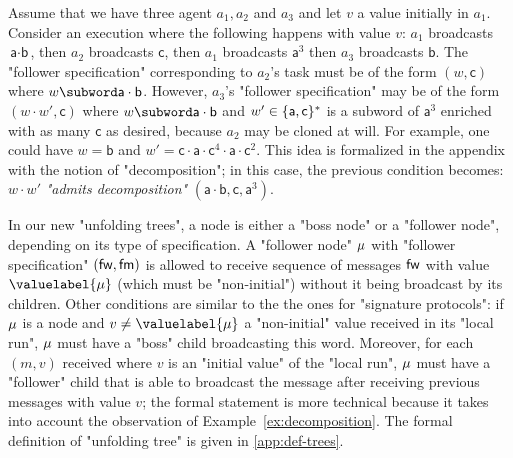 \begin{example}
\label{ex:decomposition}
Assume that we have three agent $a_1,a_2$ and $a_3$ and let $v$ a value initially in $a_1$. Consider an execution where the following happens with value $v$: $a_1$ broadcasts $\textsf{a} \cdot \textsf{b}$, then $a_2$ broadcasts $\textsf{c}$, then $a_1$ broadcasts $\textsf{a}^3$ then $a_3$ broadcasts $\textsf{b}$. The "follower specification" corresponding to $a_2$'s task must be of the form $(w, \textsf{c})$ where $w \subword \textsf{a} \cdot \textsf{b}$. However, $a_3$'s "follower specification" may be of the form $(w \cdot w', \textsf{c})$ where $w \subword \textsf{a} \cdot \textsf{b}$ and $w' \in \{\textsf{a},\textsf{c}\}^*$ is a subword of $\textsf{a}^3$ enriched with as many $\textsf{c}$ as desired, because $a_2$ may be cloned at will. For example, one could have $w= \textsf{b} $ and $w' = \textsf{c} \cdot \textsf{a} \cdot \textsf{c}^4 \cdot \textsf{a} \cdot \textsf{c}^2$. This idea is formalized in the appendix with the notion of "decomposition"; in this case, the previous condition becomes: $w \cdot w'$ \emph{"admits decomposition"} $(\textsf{a} \cdot \textsf{b}, \textsf{c}, \textsf{a}^3)$.   
\end{example}

In our new "unfolding trees", a node is either a "boss node" or a "follower node", depending on its type of specification. 
A "follower node" $\mu$ with "follower specification" $(\mathsf{fw}, \mathsf{fm})$ is allowed to receive sequence of messages $\mathsf{fw}$ with value $\valuelabel{\node}$ (which must be "non-initial") without it being broadcast by its children. 
Other conditions are similar to the the ones for "signature protocols": if $\mu$ is a node and $v \ne \valuelabel{\node}$ a "non-initial" value received in its "local run", $\mu$ must have a "boss" child broadcasting this word. Moreover, for each $(m,v)$ received where $v$ is an "initial value" of the "local run", $\mu$ must have a "follower" child that is able to broadcast the message after receiving previous messages with value $v$; the formal statement is more technical because it takes into account the observation of Example~\ref{ex:decomposition}. 
The formal definition of "unfolding tree" is given in \cref{app:def-trees}.


